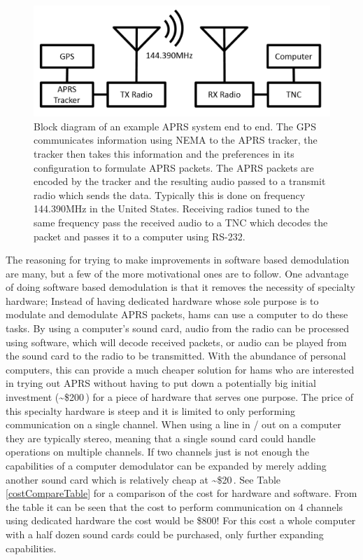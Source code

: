 \begin{figure}
  \centering
	\includegraphics[width=0.75\linewidth]{images/APRSEndToEnd.PNG} 
   \caption[Block diagram of an example APRS system end to end.]{Block diagram of an example APRS system end to end. The GPS communicates information using NEMA to the APRS tracker, the tracker then takes this information and the preferences in its configuration to formulate APRS packets. The APRS packets are encoded by the tracker and the resulting audio passed to a transmit radio which sends the data. Typically this is done on frequency 144.390MHz in the United States. Receiving radios tuned to the same frequency pass the received audio to a TNC which decodes the packet and passes it to a computer using RS-232.}
   \label{APRSEndToEnd}
\end{figure}

The reasoning for trying to make improvements in software based demodulation are many, but a few of the more motivational ones are to follow. One advantage of doing software based demodulation is that it removes the necessity of specialty hardware; Instead of having dedicated hardware whose sole purpose is to modulate and demodulate APRS packets, hams can use a computer to do these tasks. By using a computer's sound card, audio from the radio can be processed using software, which will decode received packets, or audio can be played from the sound card to the radio to be transmitted. With the abundance of personal computers, this can provide a much cheaper solution for hams who are interested in trying out APRS without having to put down a potentially big initial investment (\textasciitilde\$200\,\cite{Kantronics2014,Outlet2014}) for a piece of hardware that serves one purpose. The price of this specialty hardware is steep and it is limited to only performing communication on a single channel. When using a line in / out on a computer they are typically stereo, meaning that a single sound card could handle operations on multiple channels. If two channels just is not enough the capabilities of a computer demodulator can be expanded by merely adding another sound card which is relatively cheap at \textasciitilde\$20\,\cite{Newegg}. See Table \ref{costCompareTable} for a comparison of the cost for hardware and software. From the table it can be seen that the cost to perform communication on 4 channels using dedicated hardware the cost would be \$800! For this cost a whole computer with a half dozen sound cards could be purchased, only further expanding capabilities.

